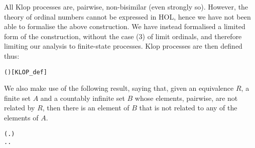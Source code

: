 All Klop processes are, pairwise,   non-bisimilar (even 
 strongly so).
However, the theory of 
 ordinal numbers cannot be expressed in HOL, 
hence we have not been able to formalise the above construction.
%
We have instead formalised a limited form of the construction, without
the case (3) of limit ordinals, and therefore limiting our analysis to
finite-state processes.
 Klop processes are then defined thus:
\begin{alltt}
   \HOLSymConst{=} 
  ( ) \HOLSymConst{=}    \HOLSymConst{+}    \hfill[KLOP_def]
\end{alltt}
We also make use of the following result, saying that, given an
equivalence $R$, a finite set $A$ and a countably infinite set $B$
whose elements, pairwise, are not related by $R$, then 
there is  an element of $B$ that is not related to any of the elements
of $A$. 
\begin{alltt}
\HOLTokenTurnstile{}   \HOLSymConst{\HOLTokenImp{}}
     \HOLSymConst{\HOLTokenConj{}}   \HOLSymConst{\HOLTokenConj{}}
   (\HOLSymConst{\HOLTokenForall{}} .  \HOLSymConst{\HOLTokenIn{}}  \HOLSymConst{\HOLTokenConj{}}  \HOLSymConst{\HOLTokenIn{}}  \HOLSymConst{\HOLTokenConj{}}  \HOLSymConst{\HOLTokenNotEqual{}}  \HOLSymConst{\HOLTokenImp{}} \HOLSymConst{\HOLTokenNeg{}}  ) \HOLSymConst{\HOLTokenImp{}}
   \HOLSymConst{\HOLTokenExists{}}.  \HOLSymConst{\HOLTokenIn{}}  \HOLSymConst{\HOLTokenConj{}} \HOLSymConst{\HOLTokenForall{}}.  \HOLSymConst{\HOLTokenIn{}}  \HOLSymConst{\HOLTokenImp{}} \HOLSymConst{\HOLTokenNeg{}}  
\end{alltt}

